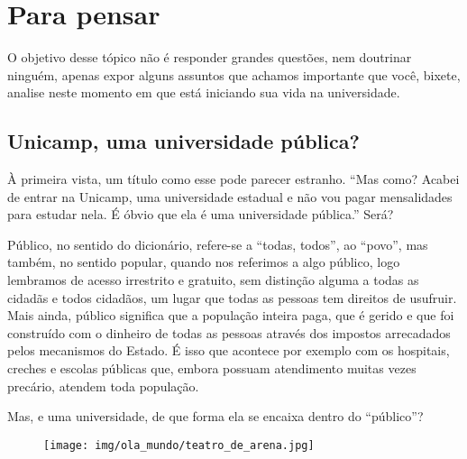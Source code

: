 
\section{Para pensar}

O objetivo desse tópico não é responder grandes questões, nem doutrinar
ninguém, apenas expor alguns assuntos que achamos importante que você, bixete,
analise neste momento em que está iniciando sua vida na universidade.

\subsection*{Unicamp, uma universidade pública?}

À primeira vista, um título como esse pode parecer estranho. ``Mas como? Acabei
de entrar na Unicamp, uma universidade estadual e não vou pagar mensalidades
para estudar nela. É óbvio que ela é uma universidade pública.'' Será?

Público, no sentido do dicionário, refere-se a ``todas, todos'', ao ``povo'',
mas também, no sentido popular, quando nos referimos a algo público, logo
lembramos de acesso irrestrito e gratuito, sem distinção alguma a todas as
cidadãs e todos cidadãos, um lugar que todas as pessoas tem direitos de
usufruir. Mais ainda, público significa que a população inteira paga, que é
gerido e que foi construído com o dinheiro de todas as pessoas através dos
impostos arrecadados pelos mecanismos do Estado. É isso que acontece por
exemplo com os hospitais, creches e escolas públicas que, embora possuam
atendimento muitas vezes precário, atendem toda população.

Mas, e uma universidade, de que forma ela se encaixa dentro do ``público''?

\begin{figure}[h!]
    \centering
    \texttt{[image: img/ola\_mundo/teatro\_de\_arena.jpg]}
\end{figure}

